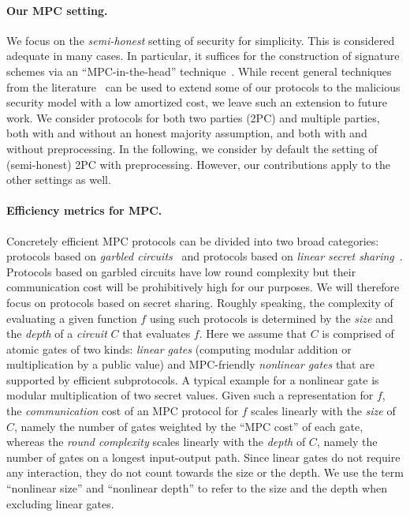 \paragraph{Our MPC setting.} We focus on the {\em semi-honest} setting of security for simplicity. This is considered adequate in many cases. In particular, it suffices for the construction of signature
schemes via an ``MPC-in-the-head'' technique~\cite{ishai2007-zkmpc,chase2017-picnic}.
While recent general techniques from the literature~\cite{BBCGI19,BGIN19} can be used to extend some of our protocols to the malicious security model with a low amortized cost, we leave such an extension to future work. We consider protocols for both two parties (2PC) and multiple parties, both with and without an honest majority assumption, and both with and without preprocessing. In the following, we consider by default the setting of (semi-honest) 2PC with preprocessing. However, our contributions apply to the other settings as well. 

\paragraph{Efficiency metrics for MPC.}   Concretely efficient MPC protocols can be divided into two broad categories: protocols based on {\em garbled circuits}~\cite{Yao} and protocols based on {\em linear secret sharing}~\cite{GMW,BGW,CCD}. Protocols based on garbled circuits have low round complexity but their communication cost will be prohibitively high for our purposes. We will therefore focus on protocols based on secret sharing. Roughly speaking, the complexity of evaluating  a given function $f$ using such protocols is determined by the {\em size} and the {\em depth} of a {\em circuit} $C$ that evaluates $f$.  Here we assume that $C$ is comprised of atomic gates of two kinds: {\em linear gates} (computing modular addition or multiplication by a public value) and MPC-friendly {\em nonlinear gates}  that are supported by efficient subprotocols. A typical example for a nonlinear gate is modular multiplication of two secret values. Given such a representation for $f$, the {\em communication} cost of an MPC protocol for $f$ scales linearly with the {\em size} of $C$, namely the number of gates weighted by the ``MPC cost'' of each gate, whereas the {\em round complexity} scales linearly with the {\em depth} of $C$, namely the number of gates on a longest input-output path. Since linear gates do not require any interaction, they do not count towards the size or the depth. We use the term ``nonlinear size'' and ``nonlinear depth'' to refer to the size and the depth when excluding linear gates. 

